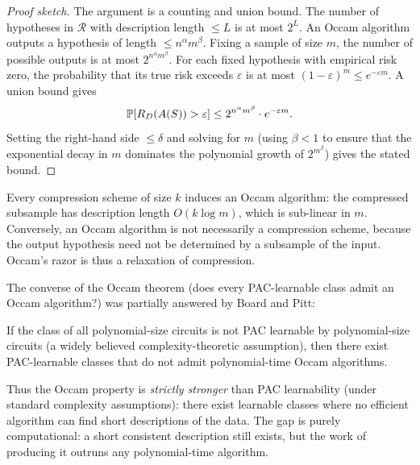 \begin{proof}[Proof sketch]
The argument is a counting and union bound.  The number of hypotheses in
$\mathcal{R}$ with description length $\leq L$ is at most $2^L$.  An Occam
algorithm outputs a hypothesis of length $\leq n^\alpha m^\beta$.  Fixing a
sample of size $m$, the number of possible outputs is at most
$2^{n^\alpha m^\beta}$.  For each fixed hypothesis with empirical risk zero, the
probability that its true risk exceeds $\varepsilon$ is at most
$(1-\varepsilon)^m \leq e^{-\varepsilon m}$.  A union bound gives
\[
  \mathbb{P}[R_D(A(S)) > \varepsilon] \leq 2^{n^\alpha m^\beta} \cdot e^{-\varepsilon m}.
\]
Setting the right-hand side $\leq \delta$ and solving for $m$ (using $\beta < 1$
to ensure that the exponential decay in $m$ dominates the polynomial growth of
$2^{m^\beta}$) gives the stated bound.
\end{proof}

\begin{remark}
\label{rmk:occam-compression}
Every compression scheme of size $k$ induces an Occam algorithm: the compressed
subsample has description length $O(k \log m)$, which is sub-linear in $m$.
Conversely, an Occam algorithm is not necessarily a compression scheme, because
the output hypothesis need not be determined by a subsample of the input.
Occam's razor is thus a relaxation of compression.
\end{remark}

The converse of the Occam theorem (does every PAC-learnable class admit an
Occam algorithm?) was partially answered by Board and Pitt:

\begin{thm}
\label{thm:board-pitt}
If the class of all polynomial-size circuits is not PAC learnable by
polynomial-size circuits (a widely believed complexity-theoretic assumption),
then there exist PAC-learnable classes that do not admit polynomial-time Occam
algorithms.
\end{thm}

Thus the Occam property is \emph{strictly stronger} than PAC learnability
(under standard complexity assumptions): there exist learnable classes where
no efficient algorithm can find short descriptions of the data.  The gap is
purely computational: a short consistent description still exists, but the
work of producing it outruns any polynomial-time algorithm.



